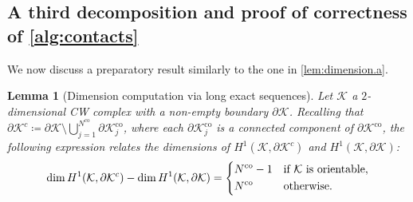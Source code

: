 \documentclass[a4paper,twoside,10pt]{article}
\theoremstyle{plain}
\newtheorem{lemma}{Lemma}
\theoremstyle{definition}
\theoremstyle{remark}
\newcommand{\mc}{\mathcal}
\newcommand{\K}{\mc{K}}
\newcommand{\rank}{\mathrm{dim}\,}
\newcommand{\co}{\mathrm{co}}
\begin{document}
\subsection{A third decomposition and proof of correctness of \cref{alg:contacts}}
We now discuss a preparatory result similarly to the one in \cref{lem:dimension.a}.
\begin{lemma}[Dimension computation via long exact sequences]
\label{lem:dimension.b}
Let $\K$ a $2$-dimensional CW complex with a non-empty boundary $\partial \K$.
Recalling that $\partial \K^{c} \coloneqq \partial \K \setminus \bigcup_{j=1}^{N^{\co}} \partial \K^{\co}_j$, where each $\partial \K^{\co}_j$ is a connected component of $\partial \K^{\co}$, the following expression relates the dimensions of $H^1(\K, \partial \K^{c})$ and $H^1(\K, \partial \K)$:
\begin{equation}
\rank{H^1(\K, \partial \K^{c})} - \rank{H^1(\K, \partial \K)} =
\begin{dcases} 
N^{\co} - 1 &\text{if $\K$ is orientable}, \\
N^{\co} &\text{otherwise}.
\end{dcases}
\label{eq:dimension.b}
\end{equation}
\end{lemma}
\end{document}
